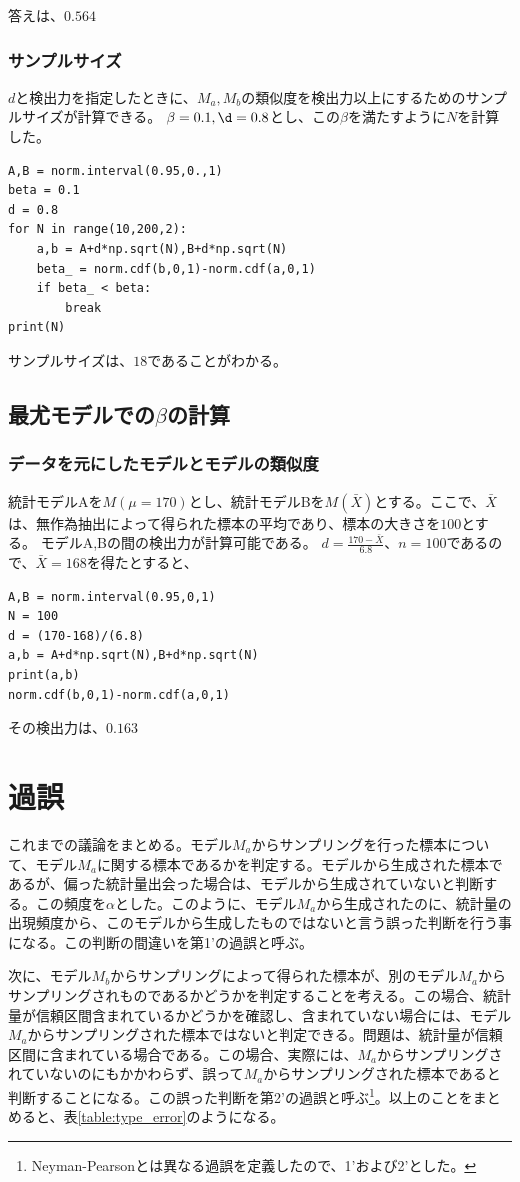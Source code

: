 答えは、$0.564$


\subsubsection{サンプルサイズ}
$d$と検出力を指定したときに、$M_a,M_b$の類似度を検出力以上にするためのサンプルサイズが計算できる。
$\beta=0.1,\d=0.8$とし、この$\beta$を満たすように$N$を計算した。

\begin{lstlisting}
A,B = norm.interval(0.95,0.,1)
beta = 0.1
d = 0.8
for N in range(10,200,2):
    a,b = A+d*np.sqrt(N),B+d*np.sqrt(N)
    beta_ = norm.cdf(b,0,1)-norm.cdf(a,0,1)
    if beta_ < beta:
        break
print(N)
\end{lstlisting}
サンプルサイズは、$18$であることがわかる。



\subsection{最尤モデルでの$\beta$の計算}
\subsubsection{データを元にしたモデルとモデルの類似度}
統計モデルAを$M(\mu=170)$とし、統計モデルBを$M(\bar{X})$とする。ここで、$\bar{X}$は、無作為抽出によって得られた標本の平均であり、標本の大きさを$100$とする。
モデルA,Bの間の検出力が計算可能である。
$d=\frac{170-\bar{X}}{6.8}$、$n=100$であるので、$\bar{X}=168$を得たとすると、
\begin{lstlisting}
A,B = norm.interval(0.95,0,1)
N = 100
d = (170-168)/(6.8)
a,b = A+d*np.sqrt(N),B+d*np.sqrt(N)
print(a,b)
norm.cdf(b,0,1)-norm.cdf(a,0,1)
\end{lstlisting}
その検出力は、$0.163$


\section{過誤}
これまでの議論をまとめる。モデル$M_a$からサンプリングを行った標本について、モデル$M_a$に関する標本であるかを判定する。モデルから生成された標本であるが、偏った統計量出会った場合は、モデルから生成されていないと判断する。この頻度を$\alpha$とした。このように、モデル$M_a$から生成されたのに、統計量の出現頻度から、このモデルから生成したものではないと言う誤った判断を行う事になる。この判断の間違いを第1'の過誤と呼ぶ。

次に、モデル$M_b$からサンプリングによって得られた標本が、別のモデル$M_a$からサンプリングされものであるかどうかを判定することを考える。この場合、統計量が信頼区間含まれているかどうかを確認し、含まれていない場合には、モデル$M_a$からサンプリングされた標本ではないと判定できる。問題は、統計量が信頼区間に含まれている場合である。この場合、実際には、$M_a$からサンプリングされていないのにもかかわらず、誤って$M_a$からサンプリングされた標本であると判断することになる。この誤った判断を第2'の過誤と呼ぶ\footnote{Neyman-Pearsonとは異なる過誤を定義したので、1'および2'とした。}。以上のことをまとめると、表\ref{table:type_error}のようになる。

